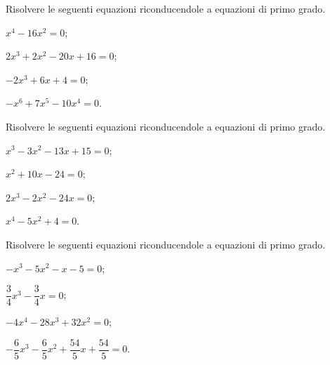 \begin{esercizio}[\Ast]
\label{ese:17.4}
Risolvere le seguenti equazioni riconducendole a equazioni di primo grado.
\begin{multicols}{2}
\begin{enumeratea}
\spazielenx
 \item $x^{4}-16x^{2}=0$;
 \item $2x^{3}+2x^{2}-20x+16=0$;
 \item $-2x^{3}+6x+4=0$;
 \item $-x^{6}+7x^{5}-10x^{4}=0$.
\end{enumeratea}
\end{multicols}
\end{esercizio}

\begin{esercizio}[\Ast]
\label{ese:17.5}
Risolvere le seguenti equazioni riconducendole a equazioni di primo grado.
\begin{multicols}{2}
\begin{enumeratea}
\spazielenx
 \item $x^{3}-3x^{2}-13x+15=0$;
 \item $x^{2}+10x-24=0$;
 \item $2x^{3}-2x^{2}-24x=0$;
 \item $x^{4}-5x^{2}+4=0$.
\end{enumeratea}
\end{multicols}
\end{esercizio}

\begin{esercizio}[\Ast]
\label{ese:17.6}
Risolvere le seguenti equazioni riconducendole a equazioni di primo grado.
\begin{multicols}{2}
\begin{enumeratea}
\spazielenx
 \item $-x^{3}-5x^{2}-x-5=0$;
 \item $\dfrac{3}{4}x^{3}-\dfrac{3}{4}x=0$;
 \item $-4x^{4}-28x^{3}+32x^{2}=0$;
 \item $-{\dfrac{6}{5}}x^{3}-\dfrac{6}{5}x^{2}+\dfrac{54}{5}x+\dfrac{54}{5}=0$.
\end{enumeratea}
\end{multicols}
\end{esercizio}

